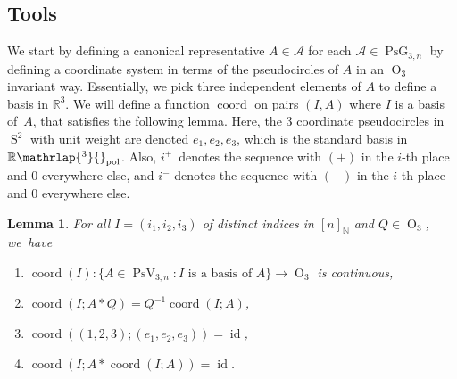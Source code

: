 \documentclass[JEP,XML,SOM,Unicode,NoFloatCountersInSection,published]{cedram}
\newtheorem{lemma}[theorem]{Lemma}
\theoremstyle{remark}
\let\mc\mathcal
\let\mb\mathbb
\DeclareMathOperator{\pg}{PsG}
\DeclareMathOperator{\orth}{O}
\DeclareMathOperator{\pstief}{PsV}
\DeclareMathOperator{\sphere}{S}
\newcommand{\Rpol}[1]{\mb{R}\mathrlap{{}^{#1}}{}_\text{pol}}
\DeclareMathOperator{\coord}{coord}
\DeclareMathOperator{\id}{id}
\begin{document}
\subsection{Tools}

We start by defining a canonical representative $A \in \mc{A}$ for each \hbox{$\mc{A} \in \pg_{3,n}$} by defining a coordinate system in terms of the pseudocircles of $A$ in an $\orth_3$ invariant way. Essentially, we pick three independent elements of $A$ to define a basis in $\mb{R}^3$.
We will define a function $\coord$
on pairs $(I,A)$ where $I$ is a basis of~$A$, that satisfies the following lemma.
Here, the $3$ coordinate pseudocircles in $\sphere^2$ with unit weight are denoted $e_1,e_2,e_3$, which is the standard basis in $\Rpol{3}$.
Also, $i^+$~denotes the sequence with $(+)$ in the $i$-th place and $0$ everywhere else, and $i^-$ denotes the sequence with $(-)$ in the $i$-th place and $0$ everywhere else.

\begin{lemma}\label{lemma-basis}
For all $I = (i_1,i_2,i_3)$ of distinct indices in $[n]_\mb{N}$ and $Q \in \orth_3$, we~have
\begin{enumerate}
\item \label{lemma-basis-continuous}
$ \coord(I) : \{A \in \pstief_{3,n} : I \text{ is a basis of } A \} \to \orth_3 $
is continuous,
\item \label{lemma-basis-equivariant}
$\coord(I;A*Q) =Q^{-1}\coord(I;A)$,
\item \label{lemma-basis-identity}
$ \coord((1,2,3);(e_1,e_2,e_3)) = \id$,
\item \label{lemma-basis-idempotent}
$\coord(I;A*\coord(I;A)) = \id$.
\end{enumerate}
\end{lemma}
\end{document}
